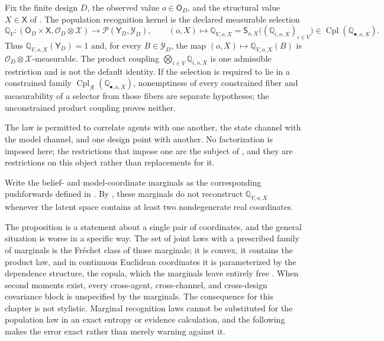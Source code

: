 Fix the finite design \(D\), the observed value \(o\in\mathsf O_D\), and the structural value \(X\in\mathsf X\) of . The population recognition kernel is the declared measurable selection
\begin{equation}
\mathbb Q_V:
\left(\mathsf O_D\times\mathsf X,\mathscr O_D\otimes\mathscr X\right)
\longrightarrow
\mathcal P\left(\mathsf Y_D,\mathscr Y_D\right),
\qquad
(o,X)\longmapsto
\mathbb Q_{V,o,X}
=\mathsf S_{o,X}\bigl((\mathbb Q_{i,o,X})_{i\in V}\bigr)
\in\operatorname{Cpl}(\mathbb Q_{\bullet,o,X}).
\label{eq:elbo-recognition-kernel}
\end{equation}
Thus \(\mathbb Q_{V,o,X}(\mathsf Y_D)=1\) and, for every \(B\in\mathscr Y_D\), the map \((o,X)\mapsto\mathbb Q_{V,o,X}(B)\) is \(\mathscr O_D\otimes\mathscr X\)-measurable. The product coupling \(\bigotimes_{i\in V}\mathbb Q_{i,o,X}\) is one admissible restriction and is not the default identity. If the selection is required to lie in a constrained family \(\operatorname{Cpl}_{\mathcal R}(\mathbb Q_{\bullet,o,X})\), nonemptiness of every constrained fiber and measurability of a selector from those fibers are separate hypotheses; the unconstrained product coupling proves neither. 

The law is permitted to correlate agents with one another, the state channel
with the model channel, and one design point with another. No factorization is
imposed here; the restrictions that impose one are the subject of
, and they are restrictions on this object rather than
replacements for it. 

Write the belief- and model-coordinate marginals as the corresponding
pushforwards defined in . By
, these marginals do not
reconstruct \(\mathbb Q_{V,o,X}\) whenever the latent space contains at
least two nondegenerate real coordinates.

The proposition is a statement about a single pair of coordinates, and the general situation is worse in a specific way. The set of joint laws with a prescribed family of marginals is the Fr\'{e}chet class of those marginals; it is convex, it contains the product law, and in continuous Euclidean coordinates it is parameterized by the dependence structure, the copula, which the marginals leave entirely free \citep{Nelsen2006}. When second moments exist, every cross-agent, cross-channel, and cross-design covariance block is unspecified by the marginals. The consequence for this chapter is not stylistic. Marginal recognition laws cannot be substituted for the population law in an exact entropy or evidence calculation, and the following makes the error exact rather than merely warning against it.

